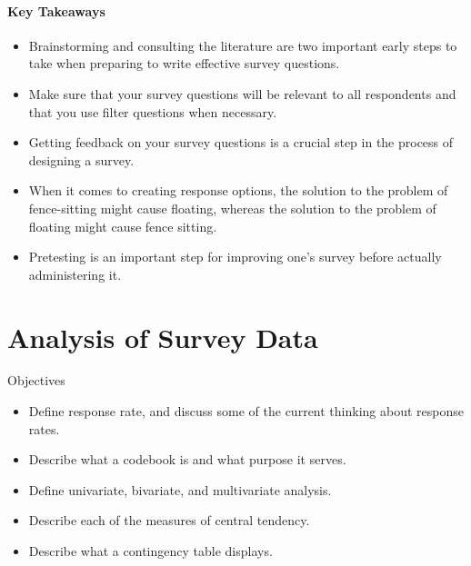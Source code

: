 \paragraph{Key Takeaways}

\begin{itemize}
	\setlength{\itemsep}{0pt}
	\setlength{\parskip}{0pt}
	\setlength{\parsep}{0pt}
	
	\item Brainstorming and consulting the literature are two important early steps to take when preparing to write effective survey questions.
	\item Make sure that your survey questions will be relevant to all respondents and that you use filter questions when necessary.
	\item Getting feedback on your survey questions is a crucial step in the process of designing a survey.
	\item When it comes to creating response options, the solution to the problem of fence-sitting might cause floating, whereas the solution to the problem of floating might cause fence sitting.
	\item Pretesting is an important step for improving one’s survey before actually administering it.
	
\end{itemize}

\section{Analysis of Survey Data}

\begin{center}
	\begin{objbox}{Objectives}
		\begin{itemize}
			\setlength{\itemsep}{0pt}
			\setlength{\parskip}{0pt}
			\setlength{\parsep}{0pt}
			
			\item Define response rate, and discuss some of the current thinking about response rates.
			\item Describe what a codebook is and what purpose it serves.
			\item Define univariate, bivariate, and multivariate analysis.
			\item Describe each of the measures of central tendency.
			\item Describe what a contingency table displays.
			
		\end{itemize}
	\end{objbox}
\end{center}

